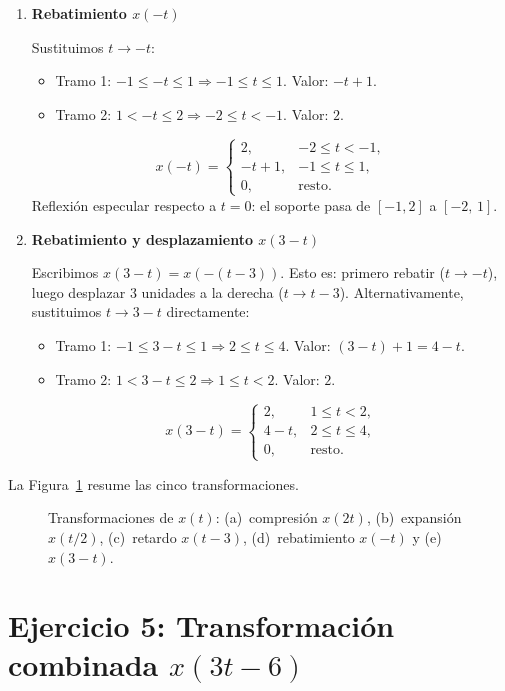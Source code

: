 \documentclass[10pt,a4paper]{article}
\begin{document}
\begin{enumerate}[label=\textbf{\alph*)}]
		\item \textbf{Rebatimiento $x(-t)$}
		
		Sustituimos $t \to -t$:
		\begin{itemize}
		    \item Tramo 1: $-1\leq -t\leq 1 \Rightarrow -1\leq t\leq 1$. Valor: $-t+1$.
		    \item Tramo 2: $1<-t\leq 2 \Rightarrow -2\leq t<-1$. Valor: $2$.
		\end{itemize}
		\[
		x(-t) =
		\begin{cases}
		2, & -2\leq t<-1, \\
		-t+1, & -1\leq t\leq 1, \\
		0, & \text{resto.}
		\end{cases}
		\]
		Reflexión especular respecto a $t=0$: el soporte pasa de $[-1,2]$ a $[-2,\, 1]$.
		
		\item \textbf{Rebatimiento y desplazamiento $x(3-t)$}
		
		Escribimos $x(3-t)=x(-(t-3))$. Esto es: primero rebatir ($t\to -t$), luego desplazar $3$ unidades a la derecha ($t\to t-3$). Alternativamente, sustituimos $t \to 3-t$ directamente:
		\begin{itemize}
		    \item Tramo 1: $-1\leq 3-t\leq 1 \Rightarrow 2\leq t\leq 4$. Valor: $(3-t)+1=4-t$.
		    \item Tramo 2: $1<3-t\leq 2 \Rightarrow 1\leq t<2$. Valor: $2$.
		\end{itemize}
		\[
		x(3-t) =
		\begin{cases}
		2, & 1\leq t<2, \\
		4-t, & 2\leq t\leq 4, \\
		0, & \text{resto.}
		\end{cases}
		\] 
	\end{enumerate}
	
	La Figura~\ref{fig:ejer5} resume las cinco transformaciones.
	
	\begin{figure}[H]
		\centering
		
		\caption{Transformaciones de $x(t)$: (a)~compresión $x(2t)$, (b)~expansión $x(t/2)$, (c)~retardo $x(t-3)$, (d)~rebatimiento $x(-t)$ y (e)~$x(3-t)$.}
		\label{fig:ejer5}
	\end{figure}

	\section*{Ejercicio 5: Transformación combinada $x(3t-6)$}
	
\end{document}

